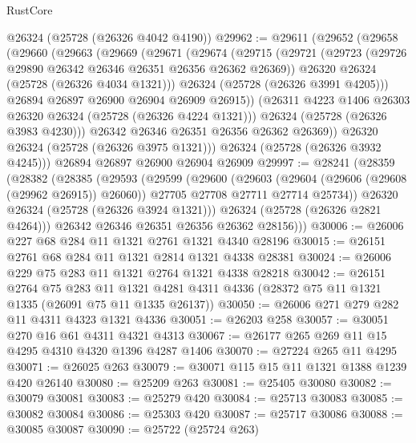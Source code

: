 \begin{lexlean}{RustCore}
\begin{coremodule}
    @26324
    (@25728 (@26326 @4042 @4190))
@29962 := @29611
    (@29652
      (@29658
        (@29660
          (@29663
            (@29669
              (@29671
                (@29674
                  (@29715
                    (@29721
                      (@29723 (@29726 @29890 @26342 @26346 @26351 @26356 @26362 @26369))
                      @26320
                      @26324
                      (@25728 (@26326 @4034 @1321)))
                    @26324
                    (@25728 (@26326 @3991 @4205)))
                  @26894
                  @26897
                  @26900
                  @26904
                  @26909
                  @26915))
              (@26311 @4223 @1406 @26303 @26320 @26324 (@25728 (@26326 @4224 @1321)))
              @26324
              (@25728 (@26326 @3983 @4230)))
            @26342
            @26346
            @26351
            @26356
            @26362
            @26369))
        @26320
        @26324
        (@25728 (@26326 @3975 @1321)))
      @26324
      (@25728 (@26326 @3932 @4245)))
    @26894
    @26897
    @26900
    @26904
    @26909
@29997 := @28241
    (@28359
      (@28382
        (@28385
          (@29593
            (@29599
              (@29600
                (@29603
                  (@29604 (@29606 (@29608 (@29962 @26915)) @26060))
                  @27705
                  @27708
                  @27711
                  @27714
                  @25734))
              @26320
              @26324
              (@25728 (@26326 @3924 @1321)))
            @26324
            (@25728 (@26326 @2821 @4264)))
          @26342
          @26346
          @26351
          @26356
          @26362
          @28156)))
@30006 := @26006 @227 @68 @284 @11 @1321 @2761 @1321 @4340 @28196
@30015 := @26151 @2761 @68 @284 @11 @1321 @2814 @1321 @4338 @28381
@30024 := @26006 @229 @75 @283 @11 @1321 @2764 @1321 @4338 @28218
@30042 := @26151
    @2764
    @75
    @283
    @11
    @1321
    @4281
    @4311
    @4336
    (@28372 @75 @11 @1321 @1335 (@26091 @75 @11 @1335 @26137))
@30050 := @26006 @271 @279 @282 @11 @4311 @4323 @1321 @4336
@30051 := @26203 @258
@30057 := @30051 @270 @16 @61 @4311 @4321 @4313
@30067 := @26177 @265 @269 @11 @15 @4295 @4310 @4320 @1396 @4287 @1406
@30070 := @27224 @265 @11 @4295
@30071 := @26025 @263
@30079 := @30071 @115 @15 @11 @1321 @1388 @1239 @420 @26140
@30080 := @25209 @263
@30081 := @25405 @30080
@30082 := @30079 @30081
@30083 := @25279 @420
@30084 := @25713 @30083
@30085 := @30082 @30084
@30086 := @25303 @420
@30087 := @25717 @30086
@30088 := @30085 @30087
@30090 := @25722 (@25724 @263)

\end{coremodule}
\end{lexlean}
